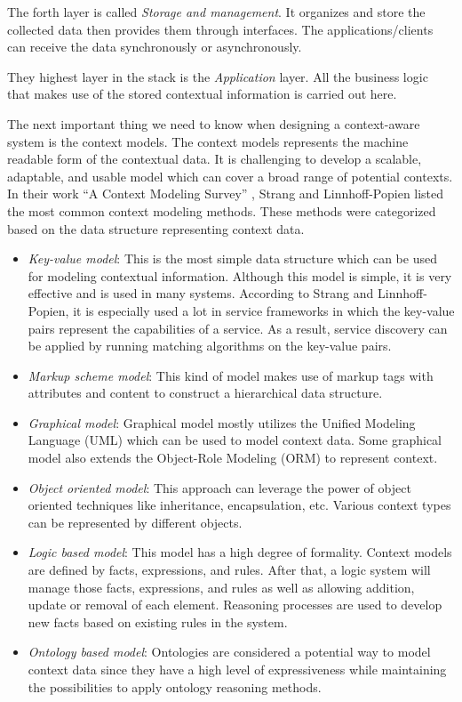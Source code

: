The forth layer is called \textit{Storage and management}. It organizes and store the collected data then provides them through interfaces. The applications/clients can receive the data synchronously or asynchronously.

They highest layer in the stack is the \textit{Application} layer. All the business logic that makes use of the stored contextual information is carried out here.

The next important thing we need to know when designing a context-aware system is the context models. The context models represents the machine readable form of the contextual data. It is challenging to develop a scalable, adaptable, and usable model which can cover a broad range of potential contexts. In their work ``A Context Modeling Survey'' \cite{strang2004context}, Strang and Linnhoff-Popien listed the most common context modeling methods. These methods were categorized based on the data structure representing context data.

\begin{itemize}
    \item \textit{Key-value model}: This is the most simple data structure which can be used for modeling contextual information. Although this model is simple, it is very effective and is used in many systems. According to Strang and Linnhoff-Popien, it is especially used a lot in service frameworks in which the key-value pairs represent the capabilities of a service. As a result, service discovery can be applied by running matching algorithms on the key-value pairs.
    \item \textit{Markup scheme model}: This kind of model makes use of markup tags with attributes and content to construct a hierarchical data structure.
    \item \textit{Graphical model}: Graphical model mostly utilizes the Unified Modeling Language (UML) which can be used to model context data. Some graphical model also extends the Object-Role Modeling (ORM) to represent context.
    \item \textit{Object oriented model}: This approach can leverage the power of object oriented techniques like inheritance, encapsulation, etc. Various context types can be represented by different objects.
    \item \textit{Logic based model}: This model has a high degree of formality. Context models are defined by facts, expressions, and rules. After that, a logic system will manage those facts, expressions, and rules as well as allowing addition, update or removal of each element. Reasoning processes are used to develop new facts based on existing rules in the system.
    \item \textit{Ontology based model}: Ontologies are considered a potential way to model context data since they have a high level of expressiveness while maintaining the possibilities to apply ontology reasoning methods.
\end{itemize}

